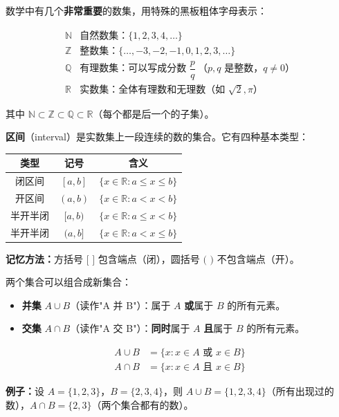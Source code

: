 \begin{definitionbox}[常见数集]
数学中有几个\textbf{非常重要}的数集，用特殊的黑板粗体字母表示：

\[
\begin{array}{c|l}
\mathbb{N} & \text{自然数集：}\{1,2,3,4,\ldots\} \\
\mathbb{Z} & \text{整数集：}\{\ldots,-3,-2,-1,0,1,2,3,\ldots\} \\
\mathbb{Q} & \text{有理数集：可以写成分数 } \dfrac{p}{q}\ \text{（}p,q \text{ 是整数，} q\neq0\text{）} \\
\mathbb{R} & \text{实数集：全体有理数和无理数（如 } \sqrt{2},\pi\text{）}
\end{array}
\]

其中 \(\mathbb{N}\subset\mathbb{Z}\subset\mathbb{Q}\subset\mathbb{R}\)（每个都是后一个的子集）。
\end{definitionbox}

\begin{definitionbox}[区间]
\textbf{区间}（interval）是实数集上一段连续的数的集合。它有四种基本类型：

\begin{center}
\begin{tabular}{c|c|c}
\textbf{类型} & \textbf{记号} & \textbf{含义} \\ \hline
闭区间 & $[a,b]$ & $\{x \in \mathbb{R} : a \le x \le b\}$ \\
开区间 & $(a,b)$ & $\{x \in \mathbb{R} : a < x < b\}$ \\
半开半闭 & $[a,b)$ & $\{x \in \mathbb{R} : a \le x < b\}$ \\
半开半闭 & $(a,b]$ & $\{x \in \mathbb{R} : a < x \le b\}$
\end{tabular}
\end{center}

\textbf{记忆方法：}方括号 $[$ $]$ 包含端点（闭），圆括号 $($ $)$ 不包含端点（开）。
\end{definitionbox}

\begin{definitionbox}
两个集合可以组合成新集合：
\begin{itemize}
  \item \textbf{并集} $A \cup B$（读作"A 并 B"）：属于 $A$ \textbf{或}属于 $B$ 的所有元素。
  \item \textbf{交集} $A \cap B$（读作"A 交 B"）：\textbf{同时}属于 $A$ \textbf{且}属于 $B$ 的所有元素。
\end{itemize}
\[
\begin{aligned}
A \cup B &= \{x : x \in A \text{ 或 } x \in B\} \\
A \cap B &= \{x : x \in A \text{ 且 } x \in B\}
\end{aligned}
\]

\textbf{例子：}设 $A = \{1,2,3\}$，$B = \{2,3,4\}$，则 $A \cup B = \{1,2,3,4\}$（所有出现过的数），$A \cap B = \{2,3\}$（两个集合都有的数）。
\end{definitionbox}

